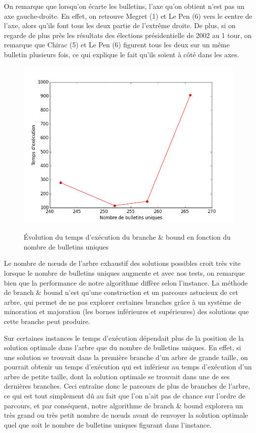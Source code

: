 \documentclass[11pt, a4paper]{article}
\begin{document}
\noindent On remarque que lorsqu'on écarte les bulletins, l'axe qu'on obtient n'est pas un axe gauche-droite. En effet, on retrouve Megret (1) et Le Pen (6) vers le centre de l'axe, alors qu'ils font tous les deux partie de l'extrême droite. De plus, si on regarde de plus près les résultats des élections présidentielle de 2002 au 1\ier{} tour, on remarque que Chirac (5) et Le Pen (6) figurent tous les deux sur un même bulletin plusieurs fois, ce qui explique le fait qu'ils soient à côté dans les axes.

\begin{figure}[H]
\centering
\includegraphics[width=14cm]{Images/graphe_bnb.png}
\label{Graphe:bnb}
\caption{Évolution du temps d'exécution du branche \& bound en fonction du nombre de bulletins uniques}
\end{figure}

Le nombre de nœuds de l'arbre exhaustif des solutions possibles croit très vite lorsque le nombre de bulletins uniques augmente et avec nos tests, on remarque bien que la performance de notre algorithme diffère selon l'instance. La méthode de branch \& bound n'est qu'une construction et un parcours astucieux de cet arbre, qui permet de ne pas explorer certaines branches grâce à un système de minoration et majoration (les bornes inférieures et supérieures) des solutions que cette branche peut produire.

Sur certaines instances le temps d'exécution dépendait plus de la position de la solution optimale dans l'arbre que du nombre de bulletins uniques. En effet, si une solution se trouvait dans la première branche d'un arbre de grande taille, on pourrait obtenir un temps d'exécution qui est inférieur au temps d'exécution d'un arbre de petite taille, dont la solution optimale se trouvait dans une de ses dernières branches. Ceci entraîne donc le parcours de plus de branches de l'arbre, ce qui est tout simplement dû au fait que l'on n'ait pas de \og chance \fg{} sur l'ordre de parcours, et par conséquent, notre algorithme de branch \& bound explorera un très grand ou très petit nombre de nœuds avant de renvoyer la solution optimale quel que soit le nombre de bulletins uniques figurant dans l'instance.\\
\end{document}
